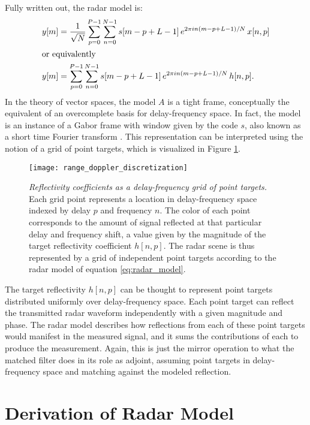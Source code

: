 Fully written out, the radar model is:
\begin{align}
 y[m] &= \frac{1}{\sqrt{N}} \sum_{p=0}^{P-1} \sum_{n=0}^{N-1} s[m - p + L-1]\, e^{2\pi i n (m-p+L-1)/N}\, x[n,p] \label{eq:radar_model_x}\\
 \intertext{or equivalently}
 y[m] &= \sum_{p=0}^{P-1} \sum_{n=0}^{N-1} s[m - p + L-1]\, e^{2\pi i n (m-p+L-1)/N}\, h[n,p]. \label{eq:radar_model}
\end{align}
In the theory of vector spaces, the model $A$ is a tight frame, conceptually the equivalent of an overcomplete basis for delay-frequency space. In fact, the model is an instance of a Gabor frame with window given by the code $s$, also known as a short time Fourier transform \autocite{Mal08}. This representation can be interpreted using the notion of a grid of point targets, which is visualized in Figure \ref{fig:delay_frequency_grid}.
\begin{figure}[tpb]
 \centering
 \texttt{[image: range\_doppler\_discretization]}
 \caption[Reflectivity coefficients as a delay-frequency grid of point targets]{\emph{Reflectivity coefficients as a delay-frequency grid of point targets.} Each grid point represents a location in delay-frequency space indexed by delay $p$ and frequency $n$. The color of each point corresponds to the amount of signal reflected at that particular delay and frequency shift, a value given by the magnitude of the target reflectivity coefficient $h[n,p]$. The radar scene is thus represented by a grid of independent point targets according to the radar model of equation \eqref{eq:radar_model}.}
 \label{fig:delay_frequency_grid}
\end{figure}%
The target reflectivity $h[n,p]$ can be thought to represent point targets distributed uniformly over delay-frequency space. Each point target can reflect the transmitted radar waveform independently with a given magnitude and phase. The radar model describes how reflections from each of these point targets would manifest in the measured signal, and it sums the contributions of each to produce the measurement. Again, this is just the mirror operation to what the matched filter does in its role as adjoint, assuming point targets in delay-frequency space and matching against the modeled reflection.

\section{Derivation of Radar Model}
\label{radar_model_derivation}
